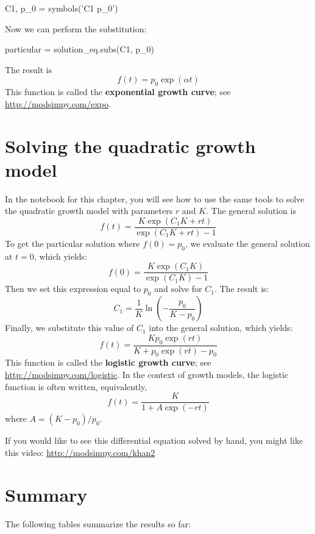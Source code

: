 \documentclass[12pt]{book}
\theoremstyle{exercise}
\begin{document}

\begin{python}
C1, p_0 = symbols('C1 p_0')
\end{python}

Now we can perform the substitution:

\begin{python}
particular = solution_eq.subs(C1, p_0)
\end{python}

The result is 
%
\[ f{\left (t \right )} = p_{0} \exp(\alpha t) \]
%
This function is called the {\bf exponential growth curve}; see \url{http://modsimpy.com/expo}.



\section{Solving the quadratic growth model}

In the notebook for this chapter, you will see how to use the same tools to solve the quadratic growth model with parameters $r$ and $K$.  The general solution is
%
\[ f{\left (t \right )} = \frac{K \exp(C_{1} K + r t)}{\exp(C_{1} K + r t) - 1} \]
%
To get the particular solution where $f(0) = p_0$, we evaluate the general solution at $t=0$, which yields:
%
\[ f(0) = \frac{K \exp(C_{1} K)}{\exp(C_{1} K) - 1} \]
%
Then we set this expression equal to $p_0$ and solve for $C_1$.  The result is:
%
\[ C_1 = \frac{1}{K} \ln{\left (- \frac{p_{0}}{K - p_{0}} \right )} \]
%
Finally, we substitute this value of $C_1$ into the general solution, which yields:
%
\[ f(t) = \frac{K p_{0} \exp(r t)}{K + p_{0} \exp(r t) - p_{0}} \]
%
This function is called the {\bf logistic growth curve}; see \url{http://modsimpy.com/logistic}.  In the context of growth models, the logistic function is often written, equivalently,
%
\[ f(t) = \frac{K}{1 + A \exp(-rt)} \]
%
where $A = (K - p_0) / p_0$.

If you would like to see this differential equation solved by hand, you might like this video: \url{http://modsimpy.com/khan2}


\section{Summary}

The following tables summarize the results so far:
\end{document}
